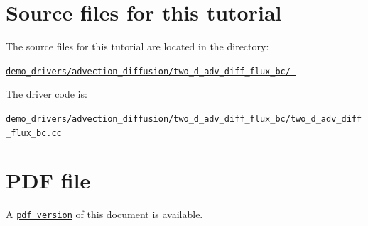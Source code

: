  

\hypertarget{index_sources}{}\section{Source files for this tutorial}\label{index_sources}

\begin{DoxyItemize}
\item The source files for this tutorial are located in the directory\+: \begin{center} \href{../../../../demo_drivers/advection_diffusion/two_d_adv_diff_flux_bc/}{\tt demo\+\_\+drivers/advection\+\_\+diffusion/two\+\_\+d\+\_\+adv\+\_\+diff\+\_\+flux\+\_\+bc/ } \end{center} 
\item The driver code is\+: \begin{center} \href{../../../../demo_drivers/advection_diffusion/two_d_adv_diff_flux_bc/two_d_adv_diff_flux_bc.cc}{\tt demo\+\_\+drivers/advection\+\_\+diffusion/two\+\_\+d\+\_\+adv\+\_\+diff\+\_\+flux\+\_\+bc/two\+\_\+d\+\_\+adv\+\_\+diff\+\_\+flux\+\_\+bc.\+cc } \end{center} 
\end{DoxyItemize}



 

 \hypertarget{index_pdf}{}\section{P\+D\+F file}\label{index_pdf}
A \href{../latex/refman.pdf}{\tt pdf version} of this document is available. 
